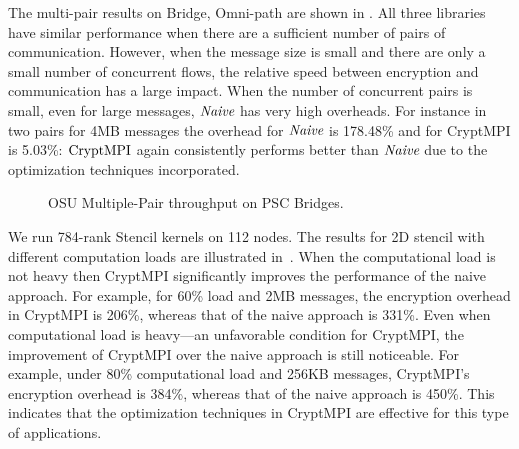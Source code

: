 The multi-pair results on Bridge, Omni-path are shown in
.
All three libraries have similar
performance when there are a sufficient number of pairs of communication.
However, when the message size is small and there are only a small number
of concurrent flows, the relative speed between encryption and communication
has a large impact. When the number of concurrent pairs is small,
even for large messages, ${\emph{Naive}}$ has very high overheads. For instance in
two pairs for 4MB messages the overhead for ${\emph{Naive}}$  is 178.48\% and
for CryptMPI is 5.03\%: $\textrm{CryptMPI}$ again consistently performs
better than ${\emph{Naive}}$ due to the optimization techniques incorporated.

\begin{figure}[hbp]
\centering
	\captionsetup{singlelinecheck=false}
	\caption{OSU Multiple-Pair throughput on PSC Bridges. }
	\label{fig:xsede_multipair_infiniband}
	\vspace{-1.5ex}
	\end{figure}





We run 784-rank Stencil kernels on 112 nodes. 
The results for 2D stencil with different computation loads
are illustrated in~. 
When the computational load is not heavy then CryptMPI
significantly improves the performance of the naive  approach. 
For example, for 60\% load and 2MB messages, 
the encryption overhead in CryptMPI is 206\%, 
whereas that of the naive approach is 331\%. 
Even when computational load is heavy---an unfavorable condition for CryptMPI, 
the improvement of CryptMPI over the naive approach is still noticeable. 
For example, under 80\% computational load and 256KB messages, CryptMPI's
encryption overhead is 384\%, 
whereas that of the naive approach is 450\%.
This indicates that the optimization techniques in CryptMPI
are effective for this type of applications. 


